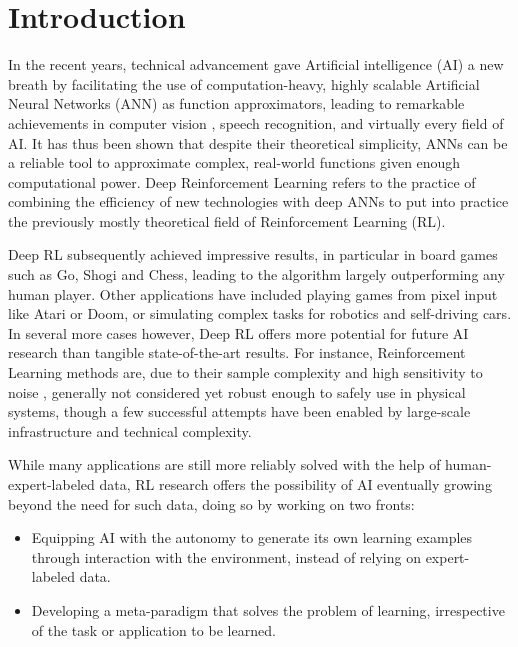 \section{Introduction}
\label{sec:intro}
In the recent years, technical advancement gave Artificial intelligence (AI) a new breath by facilitating the use of computation-heavy, highly scalable Artificial Neural Networks (ANN) as function approximators, leading to remarkable achievements in computer vision \cite{krizhevsky2012imagenet}, speech recognition\cite{dahl2011context}, and virtually every field of AI. It has thus been shown that despite their theoretical simplicity, ANNs can be a reliable tool to approximate complex, real-world functions given enough computational power. Deep Reinforcement Learning refers to the practice of combining the efficiency of new technologies with deep ANNs to put into practice the previously mostly theoretical field of Reinforcement Learning (RL). 

Deep RL subsequently achieved impressive results, in particular in board games such as Go, Shogi and Chess\cite{silver2018general}, leading to the algorithm largely outperforming any human player. Other applications have included playing games from pixel input like Atari\cite{mnih2015human} or Doom\cite{kempka2016vizdoom}, or simulating complex tasks for robotics\cite{levine2016end} and self-driving cars\cite{pan2017virtual}. In several more cases however, Deep RL offers more potential for future AI research than tangible state-of-the-art results. For instance, Reinforcement Learning methods are, due to their sample complexity and high sensitivity to noise\cite{henderson2018deep} \cite{engstrom2020implementation} \cite{dossa2021empirical}, generally not considered yet robust enough to safely use in physical systems, though a few successful attempts have been enabled by large-scale infrastructure and technical complexity. \cite{andrychowicz2020learning}

While many applications are still more reliably solved with the help of human-expert-labeled data,  RL research offers the possibility of AI eventually growing beyond the need for such data, doing so by working on two fronts:
\begin{itemize}
\item Equipping AI with the autonomy to generate its own learning examples through interaction with the environment, instead of relying on expert-labeled data.
\item Developing a meta-paradigm that solves the problem of learning, irrespective of the task or application to be learned.
\end{itemize}

